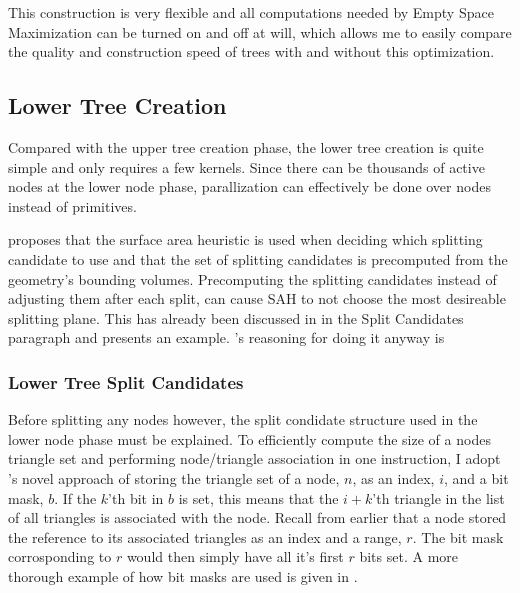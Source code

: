 This construction is very flexible and all computations needed by Empty Space
Maximization can be turned on and off at will, which allows me to easily compare
the quality and construction speed of trees with and without this optimization.

\subsection{Lower Tree Creation}\label{sec:lowerNodes}

Compared with the upper tree creation phase, the lower tree creation is quite
simple and only requires a few kernels. Since there can be thousands of active
nodes at the lower node phase, parallization can effectively be done over nodes
instead of primitives.


\zhou{} proposes that the surface area heuristic is used when deciding which
splitting candidate to use and that the set of splitting candidates is
precomputed from the geometry's bounding volumes. Precomputing the splitting
candidates instead of adjusting them after each split, can cause SAH to not
choose the most desireable splitting plane. This has already been discussed in
 in the Split Candidates paragraph and
 presents an example. \zhou's reasoning for doing it
anyway is



\subsubsection{Lower Tree Split Candidates}


Before splitting any nodes however, the split condidate structure used in the
lower node phase must be explained. To efficiently compute the size of a nodes
triangle set and performing node/triangle association in one instruction, I
adopt \zhou's novel approach of storing the triangle set of a node, $n$, as an
index, $i$, and a bit mask, $b$. If the $k$'th bit in $b$ is set, this means
that the $i+k$'th triangle in the list of all triangles is associated with the
node. Recall from earlier that a node stored the reference to its associated
triangles as an index and a range, $r$. The bit mask corrosponding to $r$ would
then simply have all it's first $r$ bits set. A more thorough example of how bit
masks are used is given in .


